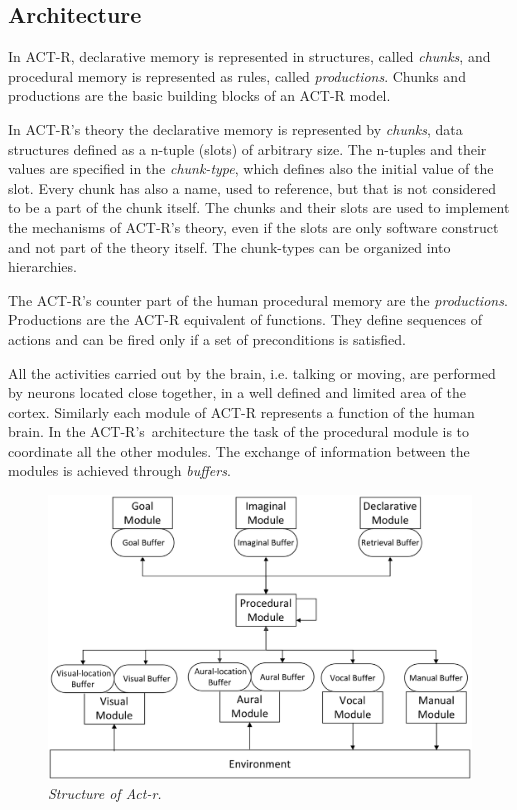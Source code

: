 	\subsection*{Architecture}
	In \mbox{ACT-R}, declarative memory is represented in structures, called \emph{chunks}, and procedural memory is represented as rules, called \emph{productions}. Chunks and productions are the basic building blocks of an ACT-R model.
	
	

	In \mbox{ACT-R's} theory the declarative memory is represented by \emph{chunks}, data structures defined as a n-tuple (slots) of arbitrary size. The n-tuples and their values are specified in the \emph{chunk-type}, which defines also the initial value of the slot. Every chunk has also a name, used to reference, but that is not considered to be a part of the chunk itself. The chunks and their slots are used to implement the mechanisms of \mbox{ACT-R's} theory, even if the slots are only software construct and not part of the theory itself. The chunk-types can be organized into hierarchies.

	The \mbox{ACT-R's} counter part of the human procedural memory are the \emph{productions}. Productions are the \mbox{ACT-R} equivalent of functions. They define sequences of actions and can be fired only if a set of preconditions is satisfied.  

	All the activities carried out by the brain, i.e. talking or moving, are performed by neurons located close together, in a well defined and limited area of the cortex. Similarly each module of \mbox{ACT-R} represents a function of the human brain. In the \mbox{ACT-R's architecture} the task of the procedural module is to coordinate all the other modules. The exchange of information between the modules is achieved through \emph{buffers}.

	\begin{figure}[h]
	  \begin{center} 
	    \includegraphics[scale=0.25]{images/ch_01/actr.eps}
	  \end{center} 
	  \caption{\textit{Structure of Act-r.}}  
	  \label{fig:modulesActr}
	\end{figure}
	
